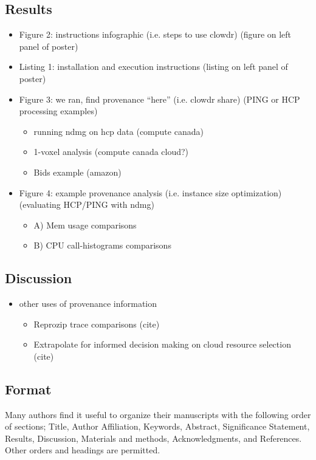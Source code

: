 \documentclass[9pt,twocolumn,twoside]{pnas-new}
\begin{document}
\subsection*{Results}
\begin{itemize}
\item Figure 2: instructions infographic (i.e. steps to use clowdr) (figure on left panel of poster)
\item Listing 1: installation and execution instructions (listing on left panel of poster)
\item Figure 3: we ran, find provenance “here” (i.e. clowdr share) (PING or HCP processing examples)
\begin{itemize}
\item running ndmg on hcp data (compute canada)
\item 1-voxel analysis (compute canada cloud?)
\item Bids example (amazon)
\end{itemize}
\item Figure 4: example provenance analysis (i.e. instance size optimization) (evaluating HCP/PING with ndmg)
\begin{itemize}
\item A) Mem usage comparisons
\item B) CPU call-histograms comparisons
\end{itemize}
\end{itemize}

\subsection*{Discussion}
\begin{itemize}
\item other uses of provenance information
\begin{itemize}
\item Reprozip trace comparisons (cite)
\item Extrapolate for informed decision making on cloud resource selection (cite)
\end{itemize}
\end{itemize}


\subsection*{Format}

Many authors find it useful to organize their manuscripts with the following order of sections;  Title, Author Affiliation, Keywords, Abstract, Significance Statement, Results, Discussion, Materials and methods, Acknowledgments, and References. Other orders and headings are permitted.
\end{document}
